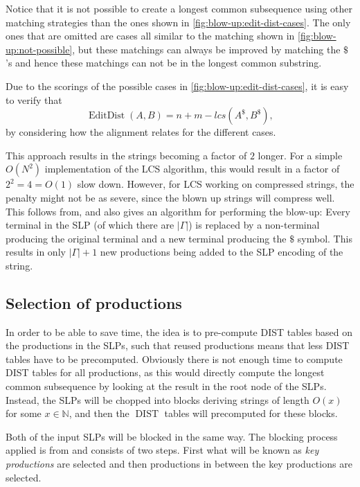 \documentclass[twoside,11pt,openright]{report}
\newcommand{\DIST}{\operatorname{DIST}}
\newcommand{\EditDist}{\operatorname{EditDist}}
\begin{document}
%
Notice that it is not possible to create a longest common subsequence using other matching strategies than the ones shown in \cref{fig:blow-up:edit-dist-cases}. The only ones that are omitted are cases all similar to the matching shown in \cref{fig:blow-up:not-possible}, but these matchings can always be improved by matching the $\$$'s and hence these matchings can not be in the longest common substring.

Due to the scorings of the possible cases in \cref{fig:blow-up:edit-dist-cases}, it is easy to verify that
\[
  \EditDist(A, B) = n + m - lcs(A^{\$}, B^{\$}),
\]
by considering how the alignment relates for the different cases.

This approach results in the strings becoming a factor of $2$ longer. For a simple $O(N^2)$ implementation of the LCS algorithm, this would result in a factor of $2^2 = 4 = O(1)$ slow down. However, for LCS working on compressed strings, the penalty might not be as severe, since the blown up strings will compress well. This follows from, and also gives an algorithm for performing the blow-up: Every terminal in the SLP (of which there are $|\Gamma|$) is replaced by a non-terminal producing the original terminal and a new terminal producing the $\$$ symbol. This results in only $|\Gamma| + 1$ new productions being added to the SLP encoding of the string.

\subsection{Selection of productions}
\label{sec:algorithm:select-productions}
In order to be able to save time, the idea is to pre-compute DIST tables based on the productions in the SLPs, such that reused productions means that less DIST tables have to be precomputed. Obviously there is not enough time to compute DIST tables for all productions, as this would directly compute the longest common subsequence by looking at the result in the root node of the SLPs. Instead, the SLPs will be chopped into blocks deriving strings of length $O(x)$ for some $x \in \mathbb{N}$, and then the $\DIST$ tables will precomputed for these blocks.

Both of the input SLPs will be blocked in the same way. The blocking process applied is from \cite[Section 4]{DBLP:journals/corr/abs-1004-1194} and consists of two steps. First what will be known as \textit{key productions} are selected and then productions in between the key productions are selected.
\end{document}
